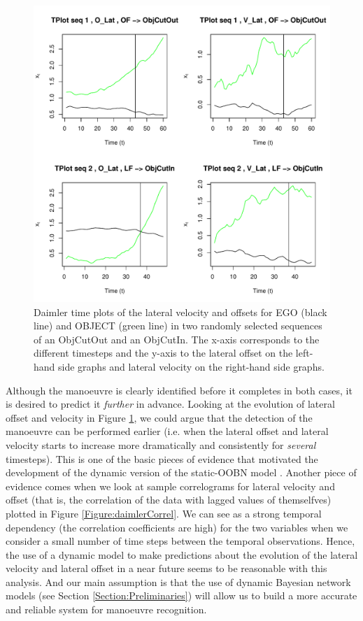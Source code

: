 \begin{figure}
\begin{center}
\includegraphics[scale=0.65]{./figures/DaimlerLE_EGO_L_LE_OBJ_R_OBJCut.pdf}
\caption{\label{Figure:daimlerTPlot}Daimler time plots of the lateral velocity and offsets for EGO (black line) and OBJECT (green line) in two randomly selected sequences of an ObjCutOut and an ObjCutIn. The x-axis corresponds to the different timesteps and the y-axis to the lateral offset on the left-hand side graphs and lateral velocity on the right-hand side graphs.}
\end{center}
\end{figure}


Although the manoeuvre is clearly identified before it completes in both cases, it is desired to predict it \textit{further} in advance. Looking at the evolution of lateral offset and velocity in Figure \ref{Figure:daimlerTPlot}, we could argue that the detection of the manoeuvre can be performed earlier (i.e. when the lateral offset and lateral velocity starts to increase more dramatically and consistently for \textit{several} timesteps). This is one of the basic pieces of evidence that motivated the development of the dynamic version of the static-OOBN model \cite{Weidl2014}.  Another piece of evidence comes when we look at sample correlograms for lateral velocity and offset (that is, the correlation of the data with lagged values of themselfves) plotted in Figure \ref{Figure:daimlerCorrel}. We can see as a strong temporal dependency (the correlation coefficients are high) for the two variables when we consider a small number of time steps between the temporal observations. Hence, the use of a dynamic model to make predictions about the evolution of the lateral velocity and lateral offset in a near future seems to be reasonable with this analysis. And our main assumption is that the use of dynamic Bayesian network models (see Section \ref{Section:Preliminaries}) will allow us to build a more accurate and reliable system for manoeuvre recognition. 

